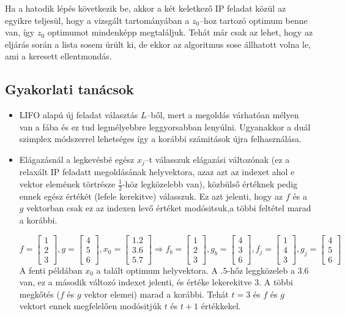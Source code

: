 Ha a hatodik lépés következik be, akkor a két keletkező IP feladat közül az
egyikre teljesül, hogy a vizsgált tartományában a $z_0$--hoz tartozó optimum
benne van, így $z_0$ optimumot mindenképp megtaláljuk. Tehát már csak az lehet,
hogy az eljárás során a lista sosem ürült ki, de ekkor az algoritmus sose
állhatott volna le, ami a keresett ellentmondás.

\subsection{Gyakorlati tanácsok}
\begin{itemize}
  \item LIFO alapú új feladat választás $L$--ből, mert a megoldás várhatóan
  mélyen van a fába és ez tud legmélyebbre leggyorsabban lenyúlni. Ugyanakkor a
  duál szimplex módszerrel lehetséges így a korábbi számitások újra felhasználása.
  \item Elágazásnál a legkevésbé egész $x_j$--t válasszuk elágazási változónak
  (ez a relaxált IP feladatt megoldásának helyvektora, azaz azt az indexet ahol
  e vektor elemének törtrésze $\frac{1}{2}$-höz legközelebb van), közbülső
  értéknek pedig ennek egész értékét (lefele kerekitve) válasszuk. Ez azt
  jelenti, hogy az $f$ és a $g$ vektorban csak ez az indexen levő értéket
  modósitsuk,a többi feltétel marad a korábbi.
  
  \[
  f=\begin{bmatrix}
  1 \\
  2 \\
  3 
  \end{bmatrix},
  g = \begin{bmatrix}
  4 \\
  5 \\
  6 
  \end{bmatrix},
  x_0 = \begin{bmatrix}
  1.2 \\
  3.6 \\
  5.7 
  \end{bmatrix}
  \Rightarrow
  f_b=\begin{bmatrix}
  1 \\
  2 \\
  3 
  \end{bmatrix},
  g_b = \begin{bmatrix}
  4 \\
  3 \\
  6 
  \end{bmatrix},
  f_j=\begin{bmatrix}
  1 \\
  4 \\
  3 
  \end{bmatrix},
  g_j = \begin{bmatrix}
  4 \\
  5 \\
  6 
  \end{bmatrix}
  \] A fenti példában $x_0$ a talált optimum helyvektora. A $.5$-hőz leggközeleb a
  $3.6$ van, ez a második változó indexet jelenti, és értéke lekerekitve $3$. A
  többi megkőtés ($f$ és $g$ vektor elemei) marad a korábbi. Tehát $t=3$ és $f$ és 
  $g$ vektort ennek megfelelően modósitjúk $t$ és $t+1$ értékkekel. 
\end{itemize}
